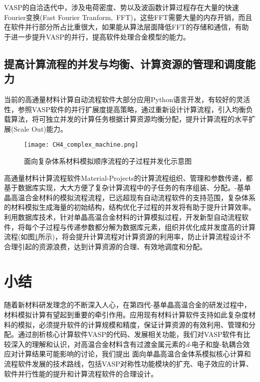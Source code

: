\textrm{VASP}的自洽迭代中，涉及电荷密度、势以及波函数计算过程存在大量的快速\textrm{Fourier}变换\textrm{(Fast Fourier Tranform,~FFT)}，这些\textrm{FFT}需要大量的内存开销，而且在软件并行部分所占比重很大，如果能从算法层面降低\textrm{FFT}的存储和通信，有助于进一步提升\textrm{VASP}的并行，提高软件处理合金模型的能力。%

\subsection{提高计算流程的并发与均衡、计算资源的管理和调度能力}
当前的高通量材料计算自动流程软件大部分应用\textrm{Python}语言开发，有较好的灵活性，参照\textrm{VASP}软件的并行扩展度提高策略，通过重新设计计算流程，引入均衡负载算法，将可独立并发的计算任务根据计算资源均衡分配，提升计算流程的水平扩展\textrm{(Scale Out)}能力。

\begin{figure}[h!]
\centering
\vskip -2pt
\texttt{[image: CH4\_complex\_machine.png]}
\caption{面向复杂体系材料模拟顺序流程的子过程并发化示意图}%
\label{CH4_comp_BCC}
\end{figure}
高通量材料计算流程软件\textrm{Material-Projects}的计算流程组织、管理和参数传递，都基于数据库实现，大大方便了复杂计算流程中的子任务的有序组装、分配。-基单晶高温合金材料的模拟流程流程，已远超现有自动流程软件的支持范围，复杂体系的材料模拟生成海量的初始结构，结构优化子过程的并发将有助于提升计算效率。利用数据库技术，针对单晶高温合金材料的计算模拟过程，开发新型自动流程软件，将每个子过程与传递参数都分解为数据库元素，组织并优化成并发度高的计算流程(如图\ref{CH4_comp_BCC}所示)，将会提升计算流程对计算资源的利用率，防止计算流程设计不合理引起的资源浪费，达到计算资源的合理、有效地调度和分配。 

\section{小结}
随着新材料研发理念的不断深入人心，在第四代-基单晶高温合金的研发过程中，材料模拟计算有望起到重要的牵引作用。应用现有材料计算软件支持如此复杂度材料的模拟，必须提升软件的计算规模和精度，保证计算资源的有效利用、管理和分配。通过剖析核心计算软件\textrm{VASP}的代码、发展相关功能，我们对\textrm{VASP}软件有比较深入的理解和认识，对高温合金材料含有过渡金属元素的\textit{d}-电子和旋-轨耦合效应对计算结果可能影响的讨论，我们提出%
面向单晶高温合金体系模拟核心计算和流程软件发展的技术路线，包括\textrm{VASP}对称性功能模块的扩充、电子效应的计算、软件并行性能的提升和计算流程软件的合理设计。
